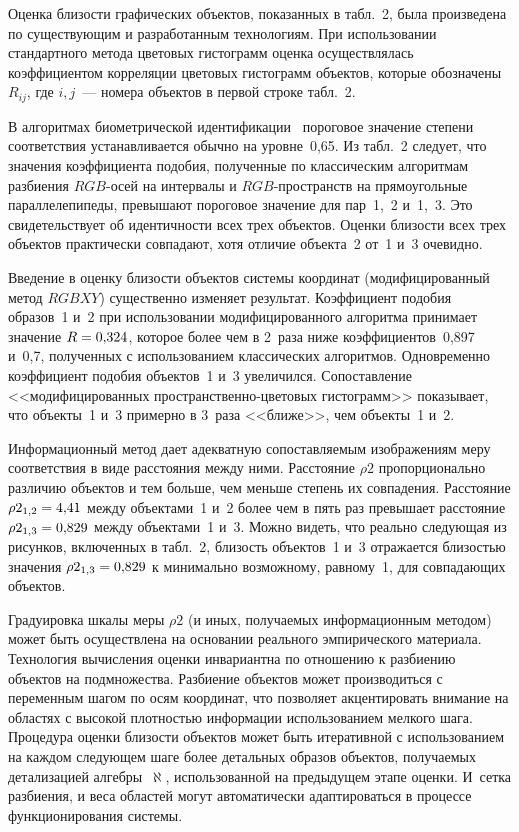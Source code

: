\begin{multicols}{2}
  Оценка близости графических объектов, показанных в табл.~2, была
произведена по су\-ще\-ст\-ву\-ющим и разработанным технологиям. При
использовании стандартного метода цветовых гистограмм оценка
осуществлялась коэффициентом корреляции цветовых гистограмм объектов,
которые обозначены~$R_{ij}$, где $i, j$~--- номера объектов в первой строке
табл.~2.  %

  В алгоритмах биометрической идентификации~\cite{9-kuz} пороговое
значение степени соответствия устанавливается обычно на уровне~0,65. Из
табл.~2 следует, что значения коэффициента подобия, полученные по
классическим алгоритмам разбиения $RGB$-осей на интервалы и
  $RGB$-про\-странств на прямоугольные параллелепипеды, превышают
пороговое значение для пар~1,~2 и~1,~3. Это свидетельствует об идентичности
всех трех объектов. Оценки близости всех трех объектов практически
совпадают, хотя отличие объекта~2 от~1 и~3 очевидно.

  Введение в оценку близости объектов системы координат
(модифицированный метод $RGBXY$) существенно изменяет результат.
Коэффициент подобия образов~1 и~2 при использовании модифицированного
алгоритма принимает значение $R \hm= 0{,}324$, которое более чем в 2~раза
ниже коэффициентов~0,897 и~0,7, полученных с использованием классических
алгоритмов. Одновременно коэффициент подобия объектов~1 и~3 увеличился.
Сопоставление <<модифицированных про\-стран\-ст\-вен\-но-цве\-то\-вых
гистограмм>> показывает, что объекты~1 и~3 примерно в 3~раза <<ближе>>,
чем объекты~1 и~2.

  Информационный метод дает адекватную сопоставляемым изображениям
меру соответствия в виде расстояния между ними. Расстояние $\rho2$
пропорционально различию объектов и тем больше, чем меньше степень их
совпадения. Расстояние $\rho2_{1,2}\hm = 4{,}41$ между объектами~1 и~2 более
чем в пять раз превышает расстояние $\rho2_{1,3}\hm = 0{,}829$ между
объектами~1 и~3. Можно видеть, что реально следующая из рисунков,
включенных в табл.~2, близость объектов~1 и~3 отражается близостью
значения $\rho2_{1,3}\hm = 0{,}829$ к минимально возможному, равному~1, для
совпадающих объектов.

  Градуировка шкалы меры $\rho2$ (и иных, полу\-ча\-емых информационным
методом) может быть осуществлена на основании реального эмпирического
материала. Технология вычисления оценки инвариантна по отношению к
разбиению объектов на подмножества. Разбиение объектов может
производиться с переменным шагом по осям координат, что позволяет
акцентировать внимание на областях с высокой плотностью информации
использованием мелкого шага. Процедура оценки близости объектов может
быть итеративной с использованием на каждом следующем шаге более
детальных образов объектов, получаемых детализацией алгебры~$\aleph$,
использованной на предыдущем этапе оценки. И~сетка разбиения, и веса
областей могут автоматически адаптироваться в процессе функционирования
сис\-темы.


\end{multicols}
